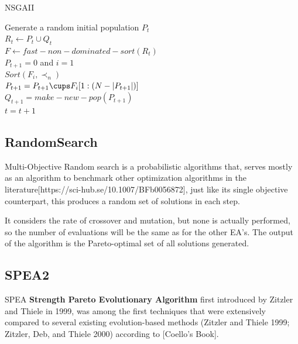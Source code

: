 \begin{algorithm}[H]
\label{nsgaii_alg}
\caption{NSGAII}
\SetAlgoLined
Generate a random initial population $P_t$\;\\
$R_t \gets P_t \cup Q_t$ \;\\
$F \gets fast-non-dominated-sort(R_t)$ \;\\
$P_{t+1} = 0$ and $i = 1$\;\\
$Sort(F_i, \prec_n)$\;\\
$P_{t+1} = P_{t+1} \cups F_i[1:(N-|P_{t+1}|)]$\;\\
$Q_{t+1} = make-new-pop(P_{t+1})$\;\\
$t = t+1$\;\\
\end{algorithm}


\subsection{RandomSearch}

Multi-Objective Random search is a probabilistic algorithms that, serves mostly as an algorithm to benchmark other optimization algorithms in the literature[https://sci-hub.se/10.1007/BFb0056872], just like its single objective counterpart, this produces a random set of solutions in each step. 

It considers the rate of crossover and mutation, but none is actually performed, so the number of evaluations will be the same as for the other EA's. The output of the algorithm is the Pareto-optimal set of all solutions generated.

\subsection{SPEA2}

SPEA \textbf{Strength Pareto Evolutionary Algorithm} first introduced by Zitzler and Thiele in 1999, was among the first techniques that were extensively compared to several existing evolution-based methods (Zitzler
and Thiele 1999; Zitzler, Deb, and Thiele 2000) according to [Coello's Book].

